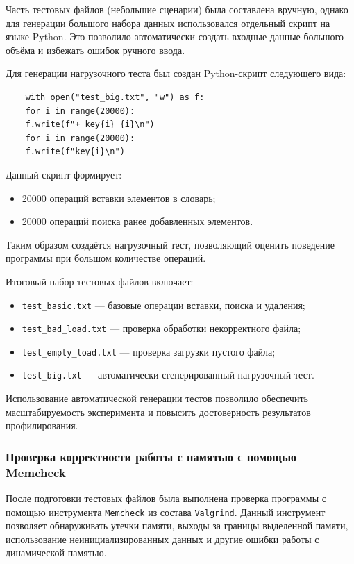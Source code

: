 \documentclass[12pt]{article}
\begin{document}
Часть тестовых файлов (небольшие сценарии) была составлена вручную, однако для генерации большого набора данных использовался отдельный скрипт на языке Python. Это позволило автоматически создать входные данные большого объёма и избежать ошибок ручного ввода.

Для генерации нагрузочного теста был создан Python-скрипт следующего вида:

\begin{verbatim}
	with open("test_big.txt", "w") as f:
	for i in range(20000):
	f.write(f"+ key{i} {i}\n")
	for i in range(20000):
	f.write(f"key{i}\n")
\end{verbatim}

Данный скрипт формирует:
\begin{itemize}
	\item 20000 операций вставки элементов в словарь;
	\item 20000 операций поиска ранее добавленных элементов.
\end{itemize}

Таким образом создаётся нагрузочный тест, позволяющий оценить поведение программы при большом количестве операций.

Итоговый набор тестовых файлов включает:
\begin{itemize}
	\item \texttt{test\_basic.txt} — базовые операции вставки, поиска и удаления;
	\item \texttt{test\_bad\_load.txt} — проверка обработки некорректного файла;
	\item \texttt{test\_empty\_load.txt} — проверка загрузки пустого файла;
	\item \texttt{test\_big.txt} — автоматически сгенерированный нагрузочный тест.
\end{itemize}

Использование автоматической генерации тестов позволило обеспечить масштабируемость эксперимента и повысить достоверность результатов профилирования.

\vspace{1\baselineskip}

\subsubsection*{Проверка корректности работы с памятью с помощью Memcheck}

После подготовки тестовых файлов была выполнена проверка программы с помощью инструмента \texttt{Memcheck} из состава \texttt{Valgrind}. Данный инструмент позволяет обнаруживать утечки памяти, выходы за границы выделенной памяти, использование неинициализированных данных и другие ошибки работы с динамической памятью.
\end{document}
